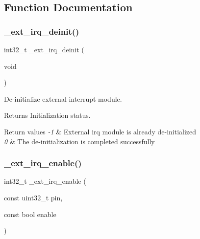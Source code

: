 \subsection{Function Documentation}
\mbox{\label{group___h_p_l_gad29f685cb658b260303c55fb7a88cdb0}} 
\subsubsection{\texorpdfstring{\+\_\+ext\+\_\+irq\+\_\+deinit()}{\_ext\_irq\_deinit()}}
{\footnotesize\ttfamily int32\+\_\+t \+\_\+ext\+\_\+irq\+\_\+deinit (\begin{DoxyParamCaption}\item[{void}]{ }\end{DoxyParamCaption})}



De-\/initialize external interrupt module. 

\begin{DoxyReturn}{Returns}
Initialization status. 
\end{DoxyReturn}

\begin{DoxyRetVals}{Return values}
{\em -\/1} & External irq module is already de-\/initialized \\
\hline
{\em 0} & The de-\/initialization is completed successfully \\
\hline
\end{DoxyRetVals}
\mbox{\label{group___h_p_l_gac2fa4b43da6356425b0188b744b6f4cc}} 
\subsubsection{\texorpdfstring{\+\_\+ext\+\_\+irq\+\_\+enable()}{\_ext\_irq\_enable()}}
{\footnotesize\ttfamily int32\+\_\+t \+\_\+ext\+\_\+irq\+\_\+enable (\begin{DoxyParamCaption}\item[{const uint32\+\_\+t}]{pin,  }\item[{const bool}]{enable }\end{DoxyParamCaption})}



